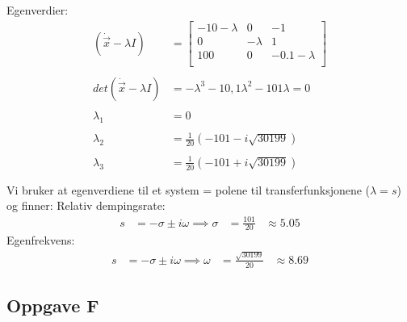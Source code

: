 Egenverdier:
\begin{equation*}
	\begin{aligned}
		(\dot{\vec{x}} - \lambda I) &=
		\begin{bmatrix}
		-10-\lambda & 0        & -1           \\
		0           & -\lambda & 1            \\
		100         & 0        & -0.1-\lambda \\
		\end{bmatrix}\\\\
		det(\dot{\vec{x}} - \lambda I) &= -\lambda ^3 -10,1\lambda ^2 - 101\lambda = 0\\\\
		\lambda _1 &= 0\\\\
		\lambda _2 &= \frac{1}{20} (-101-i\sqrt{30199})\\\\
		\lambda _3 &= \frac{1}{20} (-101 + i\sqrt{30199})\\\\
	\end{aligned}
\end{equation*}
Vi bruker at egenverdiene til et system = polene til transferfunksjonene ($\lambda = s$) og finner:
Relativ dempingsrate:
\begin{equation}
	\begin{aligned}
		s & = -\sigma \pm i\omega \implies \sigma & = \frac{101}{20} & \approx 5.05 
	\end{aligned}
	\label{damping-rate}
\end{equation}
Egenfrekvens:
\begin{equation}
	\begin{aligned}
		s & = -\sigma \pm i\omega \implies \omega & = \frac{\sqrt{30199}}{20} & \approx 8.69 
	\end{aligned}
	\label{natural-freq}
\end{equation}

\subsection{Oppgave F}
    
